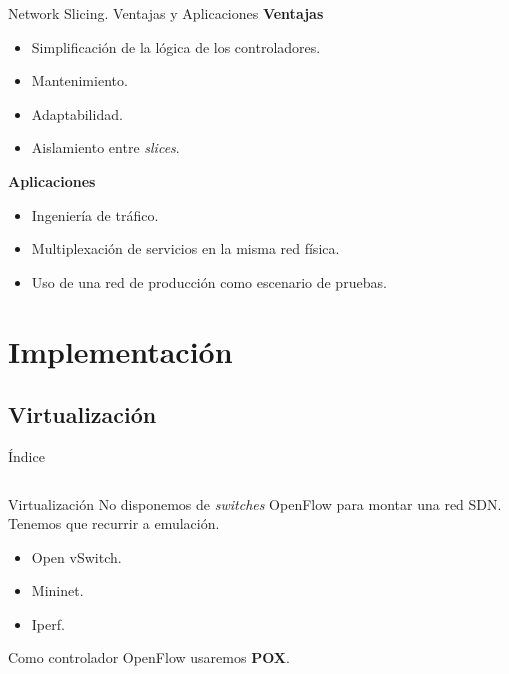 \documentclass{beamer}
\begin{document}
\begin{frame}{Network Slicing. Ventajas y Aplicaciones}
    \textbf{Ventajas}
    \begin{itemize}
        \item Simplificación de la lógica de los controladores.
        \item Mantenimiento.
        \item Adaptabilidad.
        \item Aislamiento entre \textit{slices}.
    \end{itemize}
    \vspace{20pt}
    \textbf{Aplicaciones}
    \begin{itemize}
        \item Ingeniería de tráfico.
        \item Multiplexación de servicios en la misma red física.
        \item Uso de una red de producción como escenario de pruebas.
    \end{itemize}
\end{frame}

\section{Implementación}
\subsection{Virtualización}
\begin{frame}{Índice}
    \begin{columns}[t]
        \begin{column}{1.7in}
            \tableofcontents[currentsection, subsectionstyle=show/shaded/hide, sections={1-4}]
        \end{column}
        \begin{column}{1.7in}
            \tableofcontents[currentsection, subsectionstyle=show/shaded/hide, sections={5-7}]
        \end{column}
    \end{columns}
\end{frame}

\begin{frame}{Virtualización}
   No disponemos de \textit{switches} OpenFlow para montar una red SDN. Tenemos que recurrir a emulación.\vspace{10pt}
   \begin{itemize}
       \item Open vSwitch.
       \item Mininet.
       \item Iperf.
   \end{itemize}\vspace{10pt}

    Como controlador OpenFlow usaremos \textbf{POX}.
\end{frame}
\end{document}
